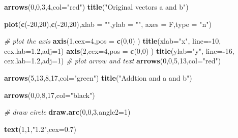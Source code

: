 \documentclass[
]{book}
\newenvironment{Shaded}{\begin{snugshade}}{\end{snugshade}}
\newcommand{\CommentTok}[1]{\textcolor[rgb]{0.56,0.35,0.01}{\textit{#1}}}
\newcommand{\DataTypeTok}[1]{\textcolor[rgb]{0.13,0.29,0.53}{#1}}
\newcommand{\DecValTok}[1]{\textcolor[rgb]{0.00,0.00,0.81}{#1}}
\newcommand{\FloatTok}[1]{\textcolor[rgb]{0.00,0.00,0.81}{#1}}
\newcommand{\KeywordTok}[1]{\textcolor[rgb]{0.13,0.29,0.53}{\textbf{#1}}}
\newcommand{\NormalTok}[1]{#1}
\newcommand{\OperatorTok}[1]{\textcolor[rgb]{0.81,0.36,0.00}{\textbf{#1}}}
\newcommand{\StringTok}[1]{\textcolor[rgb]{0.31,0.60,0.02}{#1}}
\theoremstyle{definition}
\theoremstyle{definition}
\theoremstyle{definition}
\theoremstyle{remark}
\begin{document}
\begin{Shaded}
\begin{Highlighting}[]
\KeywordTok{arrows}\NormalTok{(}\DecValTok{0}\NormalTok{,}\DecValTok{0}\NormalTok{,}\DecValTok{3}\NormalTok{,}\DecValTok{4}\NormalTok{,}\DataTypeTok{col=}\StringTok{"red"}\NormalTok{)}
\KeywordTok{title}\NormalTok{(}\StringTok{"Original vectors a and b"}\NormalTok{)}


\KeywordTok{plot}\NormalTok{(}\KeywordTok{c}\NormalTok{(}\OperatorTok{-}\DecValTok{20}\NormalTok{,}\DecValTok{20}\NormalTok{),}\KeywordTok{c}\NormalTok{(}\OperatorTok{-}\DecValTok{20}\NormalTok{,}\DecValTok{20}\NormalTok{),}\DataTypeTok{xlab =} \StringTok{""}\NormalTok{,}\DataTypeTok{ylab =} \StringTok{""}\NormalTok{,}
 \DataTypeTok{axes =}\NormalTok{ F,}\DataTypeTok{type =} \StringTok{"n"}\NormalTok{)}



\CommentTok{# plot the axis}
\KeywordTok{axis}\NormalTok{(}\DecValTok{1}\NormalTok{,}\DataTypeTok{cex=}\DecValTok{4}\NormalTok{,}\DataTypeTok{pos =} \KeywordTok{c}\NormalTok{(}\DecValTok{0}\NormalTok{,}\DecValTok{0}\NormalTok{) )}
\KeywordTok{title}\NormalTok{(}\DataTypeTok{xlab=}\StringTok{"x"}\NormalTok{, }\DataTypeTok{line=}\OperatorTok{-}\DecValTok{10}\NormalTok{, }\DataTypeTok{cex.lab=}\FloatTok{1.2}\NormalTok{,}\DataTypeTok{adj=}\DecValTok{1}\NormalTok{)}
\KeywordTok{axis}\NormalTok{(}\DecValTok{2}\NormalTok{,}\DataTypeTok{cex=}\DecValTok{4}\NormalTok{,}\DataTypeTok{pos =} \KeywordTok{c}\NormalTok{(}\DecValTok{0}\NormalTok{,}\DecValTok{0}\NormalTok{) )}
\KeywordTok{title}\NormalTok{(}\DataTypeTok{ylab=}\StringTok{"y"}\NormalTok{, }\DataTypeTok{line=}\OperatorTok{-}\DecValTok{16}\NormalTok{, }\DataTypeTok{cex.lab=}\FloatTok{1.2}\NormalTok{,}\DataTypeTok{adj=}\DecValTok{1}\NormalTok{)}
\CommentTok{# plot arrow and text}
\KeywordTok{arrows}\NormalTok{(}\DecValTok{0}\NormalTok{,}\DecValTok{0}\NormalTok{,}\DecValTok{5}\NormalTok{,}\DecValTok{13}\NormalTok{,}\DataTypeTok{col=}\StringTok{"red"}\NormalTok{)}

\KeywordTok{arrows}\NormalTok{(}\DecValTok{5}\NormalTok{,}\DecValTok{13}\NormalTok{,}\DecValTok{8}\NormalTok{,}\DecValTok{17}\NormalTok{,}\DataTypeTok{col=}\StringTok{"green"}\NormalTok{)}
\KeywordTok{title}\NormalTok{(}\StringTok{"Addtion and a and b"}\NormalTok{)}

\KeywordTok{arrows}\NormalTok{(}\DecValTok{0}\NormalTok{,}\DecValTok{0}\NormalTok{,}\DecValTok{8}\NormalTok{,}\DecValTok{17}\NormalTok{,}\DataTypeTok{col=}\StringTok{"black"}\NormalTok{)}


\CommentTok{# draw circle}
\KeywordTok{draw.arc}\NormalTok{(}\DecValTok{0}\NormalTok{,}\DecValTok{0}\NormalTok{,}\DecValTok{3}\NormalTok{,}\DataTypeTok{angle2=}\DecValTok{1}\NormalTok{)}

\KeywordTok{text}\NormalTok{(}\DecValTok{1}\NormalTok{,}\DecValTok{1}\NormalTok{,}\StringTok{"1.2"}\NormalTok{,}\DataTypeTok{cex=}\FloatTok{0.7}\NormalTok{)}
\end{Highlighting}
\end{Shaded}
\end{document}
